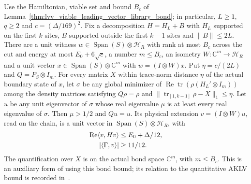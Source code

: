 \begin{lemma}
    \label{thm:lvv_uniform_leading_bounds_library_bond}
    \leanok
    Use the Hamiltonian, viable set and bound $B_c$ of
    Lemma~\ref{thm:lvv_viable_leading_vector_library_bond}; in particular,
    $L\ge1$, $q\ge2$ and $c=(\Delta/169)^2$.
    Fix a decomposition $H=H_L+B$ with $H_L$ supported on the first
    $k$ sites, $B$ supported outside the first $k-1$ sites and $\|B\|\le2L$.
    There are a unit witness $w\in\operatorname{Span}(S)\otimes\mathcal H_R$
    with rank at most $B_c$ across the cut and energy at most
    $E_0+6\sqrt c$, a number $m\le B_c$, an isometry
    $W:\mathbb C^m\to\mathcal H_R$ and a unit vector
    $x\in\operatorname{Span}(S)\otimes\mathbb C^m$ with $w=(I\otimes W)x$.
    Put $\eta=c/(2L)$ and $Q=P_S\otimes I_m$.
    For every matrix $X$ within trace-norm distance $\eta$ of the actual
    boundary state of $x$, let $\sigma$ be any global minimizer of
    $\operatorname{Re}\operatorname{tr}(\rho(H_L'\otimes I_m))$ among
    the density matrices satisfying
    $Q\rho=\rho$ and
    $\|\operatorname{tr}_{[1,k-1]}\rho-X\|_1\le\eta$.
    Let $u$ be any unit eigenvector of $\sigma$ whose real eigenvalue
    $\mu$ is at least every real eigenvalue of $\sigma$.
    Then $\mu>1/2$ and $Qu=u$. Its physical extension
    $v=(I\otimes W)u$, read on the chain, is a unit vector in
    $\operatorname{Span}(S)\otimes\mathcal H_R$, with
    \begin{align}
        \operatorname{Re}\langle v,Hv\rangle & \le E_0+\Delta/12,\notag \\
        |\langle\Gamma,v\rangle|             & \ge11/12.\notag
    \end{align}
    The quantification over $X$ is on the actual bond space
    $\mathbb C^m$, with $m\le B_c$. This is an auxiliary form of
    \cite[Lemma~2.5, source lines 493--505]{Landau2015Polynomial} using
    this bond bound; its relation to the quantitative AKLV bound
    is recorded in~\cite{gap:lvv13_constant_bond}.
\end{lemma}
